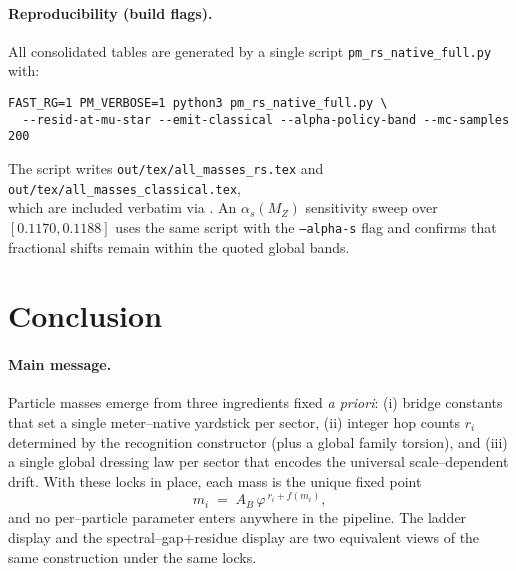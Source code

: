 \documentclass[epjc3]{svjour3}
\begin{document}
\paragraph{Reproducibility (build flags).}
All consolidated tables are generated by a single script \texttt{pm\_rs\_native\_full.py} with:
{\small
\begin{verbatim}
FAST_RG=1 PM_VERBOSE=1 python3 pm_rs_native_full.py \
  --resid-at-mu-star --emit-classical --alpha-policy-band --mc-samples 200
\end{verbatim}
}
The script writes \texttt{out/tex/all\_masses\_rs.tex} and
\texttt{out/tex/all\_masses\_classical.tex},\\ which are included verbatim via \verb||.
An $\alpha_s(M_Z)$ sensitivity sweep over $[0.1170,0.1188]$ uses the same script with the
\texttt{--alpha-s} flag and confirms that fractional shifts remain within the quoted global bands.

\section{Conclusion}

\paragraph{Main message.}
Particle masses emerge from three ingredients fixed \emph{a priori}: (i) bridge constants that set a single meter–native yardstick per sector, (ii) integer hop counts $r_i$ determined by the recognition constructor (plus a global family torsion), and (iii) a single global dressing law per sector that encodes the universal scale–dependent drift. With these locks in place, each mass is the unique fixed point
\[
m_i \;=\; A_B\,\varphi^{\,r_i+f(m_i)},
\]
and no per–particle parameter enters anywhere in the pipeline. The ladder display and the spectral–gap$+$residue display are two equivalent views of the same construction under the same locks.
\end{document}
